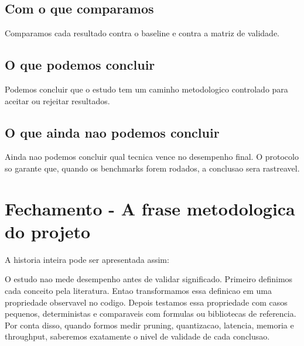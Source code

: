 \subsection{Com o que comparamos}



Comparamos cada resultado contra o baseline e contra a matriz de validade.



\subsection{O que podemos concluir}




Podemos concluir que o estudo tem um caminho metodologico controlado para aceitar ou rejeitar resultados.



\subsection{O que ainda nao podemos concluir}





Ainda nao podemos concluir qual tecnica vence no desempenho final. O protocolo so garante que, quando os benchmarks forem rodados, a conclusao sera rastreavel.



\section{Fechamento - A frase metodologica do projeto}



A historia inteira pode ser apresentada assim:



\begin{icquote}
O estudo nao mede desempenho antes de validar significado. Primeiro definimos cada conceito pela literatura. Entao transformamos essa definicao em uma propriedade observavel no codigo. Depois testamos essa propriedade com casos pequenos, deterministas e comparaveis com formulas ou bibliotecas de referencia. Por conta disso, quando formos medir pruning, quantizacao, latencia, memoria e throughput, saberemos exatamente o nivel de validade de cada conclusao.
\end{icquote}








